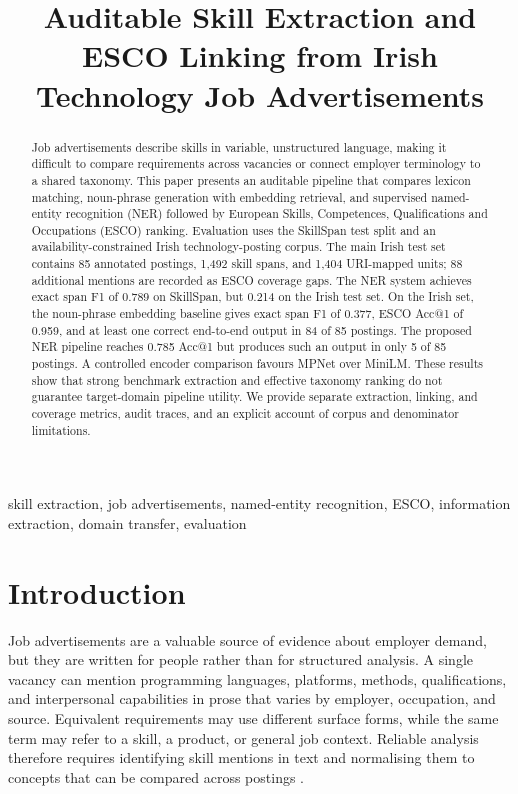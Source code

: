 \documentclass[conference]{IEEEtran}
\begin{document}
\title{Auditable Skill Extraction and ESCO Linking from Irish Technology Job Advertisements}

\author{
}

\maketitle

\begin{abstract}
Job advertisements describe skills in variable, unstructured language, making it difficult to compare requirements across vacancies or connect employer terminology to a shared taxonomy. This paper presents an auditable pipeline that compares lexicon matching, noun-phrase generation with embedding retrieval, and supervised named-entity recognition (NER) followed by European Skills, Competences, Qualifications and Occupations (ESCO) ranking. Evaluation uses the SkillSpan test split and an availability-constrained Irish technology-posting corpus. The main Irish test set contains 85 annotated postings, 1,492 skill spans, and 1,404 URI-mapped units; 88 additional mentions are recorded as ESCO coverage gaps. The NER system achieves exact span F1 of 0.789 on SkillSpan, but 0.214 on the Irish test set. On the Irish set, the noun-phrase embedding baseline gives exact span F1 of 0.377, ESCO Acc@1 of 0.959, and at least one correct end-to-end output in 84 of 85 postings. The proposed NER pipeline reaches 0.785 Acc@1 but produces such an output in only 5 of 85 postings. A controlled encoder comparison favours MPNet over MiniLM. These results show that strong benchmark extraction and effective taxonomy ranking do not guarantee target-domain pipeline utility. We provide separate extraction, linking, and coverage metrics, audit traces, and an explicit account of corpus and denominator limitations.
\end{abstract}

\begin{IEEEkeywords}
skill extraction, job advertisements, named-entity recognition, ESCO, information extraction, domain transfer, evaluation
\end{IEEEkeywords}

\section{Introduction}
Job advertisements are a valuable source of evidence about employer demand, but they are written for people rather than for structured analysis. A single vacancy can mention programming languages, platforms, methods, qualifications, and interpersonal capabilities in prose that varies by employer, occupation, and source. Equivalent requirements may use different surface forms, while the same term may refer to a skill, a product, or general job context. Reliable analysis therefore requires identifying skill mentions in text and normalising them to concepts that can be compared across postings \cite{Khaouja2021,Rahhal2024,Senger2024}.
\end{document}
